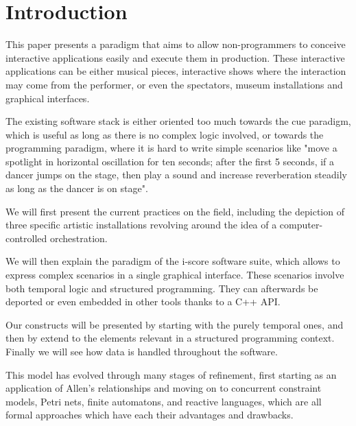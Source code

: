 \documentclass{sigchi}
\begin{document}


\section{Introduction}
This paper presents a paradigm that aims to allow non-programmers 
to conceive interactive applications easily and execute them in production. These interactive applications can be either musical pieces, interactive shows where the interaction may come from the performer, or even the spectators, museum installations and graphical interfaces.

The existing software stack is either oriented too much towards the 
cue paradigm, which is useful as long as there is no complex logic involved, 
or towards the programming paradigm, where it is hard to write simple scenarios 
like "move a spotlight in horizontal oscillation for ten seconds; after the first 5 
seconds, if a dancer jumps on the stage, then play a sound and increase reverberation steadily as long as the dancer is on stage".

We will first present the current practices on the field, including the depiction of three specific artistic installations revolving around the idea of a computer-controlled orchestration.

We will then explain the paradigm of the i-score software suite, which allows to express complex scenarios in a single graphical interface. These scenarios involve both temporal logic and structured programming. They can afterwards be deported or even embedded in other tools thanks to a C++ API. 

Our constructs will be presented by starting with the purely temporal ones, 
and then by extend to the elements relevant in a structured programming context.
Finally we will see how data is handled throughout the software.

This model has evolved through many stages of refinement, first starting as an application of 
Allen's relationships\cite{allen1983maintaining} and moving on to concurrent constraint models\cite{allombert2006concurrent,toro2010concurrent}, Petri nets\cite{allombert2007system,arias2014modelling}, finite automatons\cite{arias2015exploiting}, and reactive languages\cite{ariasexecuting}, which are all formal approaches which have each their advantages and drawbacks. 
\end{document}
